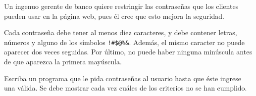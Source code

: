 Un ingenuo gerente de banco
quiere restringir las contraseñas
que los clientes pueden usar en la página web,
pues él cree que esto mejora la seguridad.

Cada contraseña debe tener al menos diez caracteres,
y debe contener letras, números y alguno de los símbolos \verb+!#$@%&+.
Además, el mismo caracter no puede aparecer dos veces seguidas.
Por último, no puede haber ninguna minúscula
antes de que aparezca la primera mayúscula.

Escriba un programa que le pida contraseñas al usuario
hasta que éste ingrese una válida.
Se debe mostrar cada vez cuáles de los criterios
no se han cumplido.

\begin{minipage}[t]{.60\textwidth}
  
\end{minipage}
